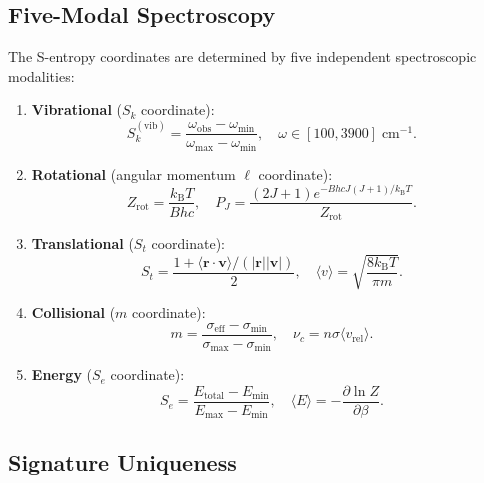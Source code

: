 \documentclass[twocolumn,10pt]{article}
\theoremstyle{definition}
\newcommand{\kB}{k_{\mathrm{B}}}
\newcommand{\Sk}{S_k}
\newcommand{\St}{S_t}
\newcommand{\Se}{S_e}
\begin{document}
\subsection{Five-Modal Spectroscopy}

The S-entropy coordinates are determined by five independent spectroscopic modalities:

\begin{enumerate}[nosep]
    \item \textbf{Vibrational} ($\Sk$ coordinate):
    \begin{equation}
        \Sk^{(\mathrm{vib})} = \frac{\omega_{\mathrm{obs}} - \omega_{\min}}{\omega_{\max} - \omega_{\min}}, \quad \omega \in [100, 3900]\;\text{cm}^{-1}.
    \end{equation}

    \item \textbf{Rotational} (angular momentum $\ell$ coordinate):
    \begin{equation}
        Z_{\mathrm{rot}} = \frac{\kB T}{Bhc}, \quad P_J = \frac{(2J+1)e^{-BhcJ(J+1)/\kB T}}{Z_{\mathrm{rot}}}.
    \end{equation}

    \item \textbf{Translational} ($\St$ coordinate):
    \begin{equation}
        \St = \frac{1 + \langle\mathbf{r}\cdot\mathbf{v}\rangle/(|\mathbf{r}||\mathbf{v}|)}{2}, \quad \langle v\rangle = \sqrt{\frac{8\kB T}{\pi m}}.
    \end{equation}

    \item \textbf{Collisional} ($m$ coordinate):
    \begin{equation}
        m = \frac{\sigma_{\mathrm{eff}} - \sigma_{\min}}{\sigma_{\max} - \sigma_{\min}}, \quad \nu_c = n\sigma\langle v_{\mathrm{rel}}\rangle.
    \end{equation}

    \item \textbf{Energy} ($\Se$ coordinate):
    \begin{equation}
        \Se = \frac{E_{\mathrm{total}} - E_{\min}}{E_{\max} - E_{\min}}, \quad \langle E\rangle = -\frac{\partial\ln Z}{\partial\beta}.
    \end{equation}
\end{enumerate}

\subsection{Signature Uniqueness}
\end{document}
